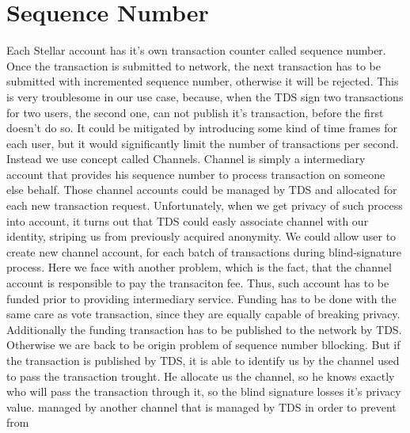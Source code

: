 \documentclass[runningheads]{llncs}
\begin{document}
\section{Sequence Number}
Each Stellar account has it's own transaction counter called sequence number. Once the transaction is submitted to network, the next transaction has to be submitted with incremented sequence number, otherwise it will be rejected. This is very troublesome in our use case, because, when the TDS sign two transactions for two users, the second one, can not publish it's transaction, before the first doesn't do so. It could be mitigated by introducing some kind of time frames for each user, but it would significantly limit the number of transactions per second.
Instead we use concept called Channels. Channel is simply a intermediary account that provides his sequence number to process transaction on someone else behalf. Those channel accounts could be managed by TDS and allocated for each new transaction request. Unfortunately, when we get privacy of such process into account, it turns out that TDS could easly associate channel with our identity, striping us from previously acquired anonymity. 
We could allow user to create new channel account, for each batch of transactions during blind-signature process. Here we face with another problem, which is the fact, that the channel account is responsible to pay the transaciton fee. Thus, such account has to be funded prior to providing intermediary service. Funding has to be done with the same care as vote transaction, since they are equally capable of breaking privacy. 
Additionally the funding transaction has to be published to the network by TDS. Otherwise we are back to be origin problem of sequence number bllocking. But if the transaction is published by TDS, it is able to identify us by the channel used to pass the transaction trought. He allocate us the channel, so he knows exactly who will pass the transaction through it, so the blind signature losses it's privacy value.  managed by another channel that is managed by TDS in order to prevent from 
\end{document}
